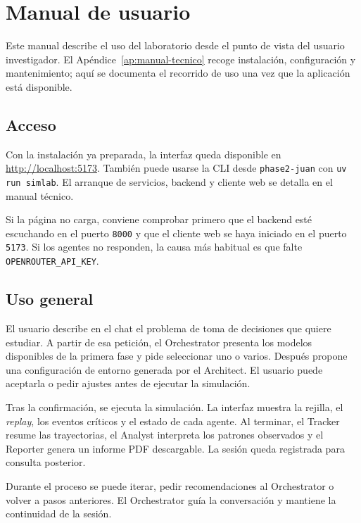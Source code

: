 \chapter{Manual de usuario}
\label{ap:manual-usuario}

Este manual describe el uso del laboratorio desde el punto de vista del usuario
investigador. El Apéndice~\ref{ap:manual-tecnico} recoge instalación,
configuración y mantenimiento; aquí se documenta el recorrido de uso una vez que
la aplicación está disponible.

\section{Acceso}

Con la instalación ya preparada, la interfaz queda disponible en
\url{http://localhost:5173}. También puede usarse la CLI desde
\texttt{phase2-juan} con \texttt{uv run simlab}. El arranque de servicios,
backend y cliente web se detalla en el manual técnico.

Si la página no carga, conviene comprobar primero que el backend esté escuchando
en el puerto \texttt{8000} y que el cliente web se haya iniciado en el puerto
\texttt{5173}. Si los agentes no responden, la causa más habitual es que falte
\texttt{OPENROUTER\_API\_KEY}.

\section{Uso general}

El usuario describe en el chat el problema de toma de decisiones que quiere
estudiar. A partir de esa petición, el Orchestrator presenta los modelos
disponibles de la primera fase y pide seleccionar uno o varios. Después propone
una configuración de entorno generada por el Architect. El usuario puede
aceptarla o pedir ajustes antes de ejecutar la simulación.

Tras la confirmación, se ejecuta la simulación. La interfaz muestra la rejilla,
el \textit{replay}, los eventos críticos y el estado de cada agente. Al
terminar, el Tracker resume las trayectorias, el Analyst interpreta los patrones
observados y el Reporter genera un informe PDF descargable. La sesión queda
registrada para consulta posterior.

Durante el proceso se puede iterar, pedir recomendaciones al Orchestrator o
volver a pasos anteriores. El Orchestrator guía la conversación y mantiene la
continuidad de la sesión.

